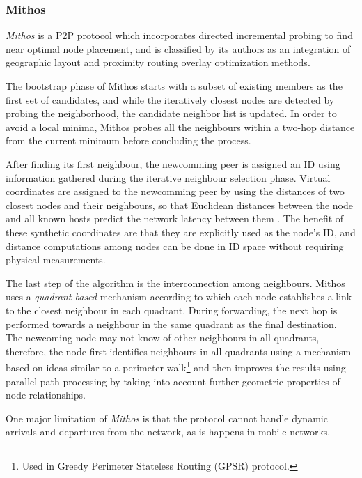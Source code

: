 \subsubsection{Mithos}
\emph{Mithos} \cite{waldvogel_mythos_2003} is a P2P protocol which incorporates
directed incremental probing to find near optimal node placement, and is
classified by its authors as an integration of geographic layout and proximity
routing overlay optimization methods.

The bootstrap phase of Mithos starts with a subset of existing members as the
first set of candidates, and while the iteratively closest nodes are detected by
probing the neighborhood, the candidate neighbor list is updated. In order to
avoid a local minima, Mithos probes all the neighbours within a two-hop distance
from the current minimum before concluding the process.

After finding its first neighbour, the newcomming peer is assigned an ID using
information gathered during the iterative neighbour selection phase. Virtual
coordinates are assigned to the newcomming peer by using the distances of two
closest nodes and their neighbours, so that Euclidean distances between the node
and all known hosts predict the network latency between them
\cite{cox_vivaldi_2004}. The benefit of these synthetic coordinates are that
they are explicitly used as the node's ID, and distance computations among nodes
can be done in ID space without requiring physical measurements.

The last step of the algorithm is the interconnection among neighbours. Mithos
uses a \emph{quadrant-based} mechanism according to which each node establishes
a link to the closest neighbour in each quadrant. During forwarding, the next
hop is performed towards a neighbour in the same quadrant as the final
destination. The newcoming node may not know of other neighbours in all
quadrants, therefore, the node first identifies neighbours in all quadrants
using a mechanism based on ideas similar to a perimeter walk\footnote{Used in
Greedy Perimeter Stateless Routing (GPSR) protocol.} and then improves the
results using parallel path processing by taking into account further geometric
properties of node relationships.

One major limitation of \textit{Mithos} is that the protocol cannot handle
dynamic arrivals and departures from the network, as is happens in mobile
networks.

%
%

